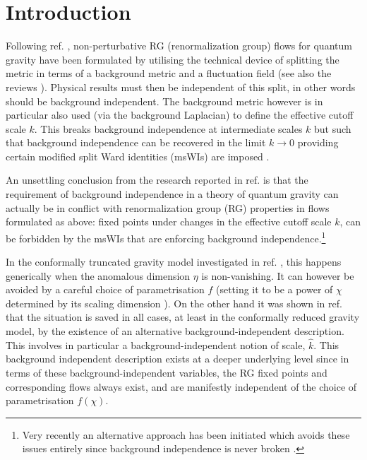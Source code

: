 \documentclass[11pt,a4paper]{article}
\numberwithin{figure}{section}
\numberwithin{equation}{section}
\begin{document}
\renewcommand{\thefootnote}{\arabic{footnote}}
\setcounter{footnote}{0}

\newpage

\tableofcontents

\newpage



\section{Introduction}\label{sec:introduction}


Following ref. \cite{Reuter:1996}, non-perturbative RG (renormalization group) flows for quantum gravity have been formulated by utilising the technical device of splitting the metric in terms of a background metric and a fluctuation field (see also the reviews \cite{Reuter:2012,Percacci:2011fr,Niedermaier:2006wt,Nagy:2012ef,Litim:2011cp}). Physical results must then be independent of this split, in other words should be background independent. The background metric however is in particular also used (via the background Laplacian) to define the effective cutoff scale $k$. This breaks background independence at intermediate scales $k$ but such that background independence can be recovered in the limit $k\to0$ providing certain modified split Ward identities (msWIs) are imposed \cite{Pawlowski:2005xe,Litim:2002hj,Bridle:2013sra,Reuter:1997gx,Litim:1998nf,Litim:2002ce,Manrique:2009uh,Manrique:2010mq,Manrique:2010am,Dietz:2015owa,Safari:2015dva}.



An unsettling conclusion from the research reported in ref. \cite{Dietz:2015owa} is that the requirement of background independence in a theory of quantum gravity can actually be in conflict with renormalization group (RG) properties in flows formulated as above: fixed points under changes in the effective cutoff scale $k$, can be forbidden by the msWIs  that are enforcing background independence.\footnote{Very recently an alternative approach has been initiated which avoids these issues entirely since background independence is never broken \cite{Morris:2016nda}.} 

In the conformally truncated gravity model investigated in ref.  \cite{Dietz:2015owa}, this happens generically when the anomalous dimension $\eta$ is non-vanishing.
It can however be avoided by a careful choice of parametrisation $f$ (setting it to be a power of $\chi$ determined by its scaling dimension \cite{Dietz:2015owa}).
On the other hand it was shown in ref. \cite{Dietz:2015owa} that the situation is saved in all cases, at least in the conformally reduced gravity model, by the existence of an alternative background-independent description. This involves in particular a background-independent notion of scale, $\hat{k}$. This background independent description exists at a deeper underlying level since in terms of these background-independent variables, the RG fixed points and corresponding flows always exist, and are manifestly independent of the choice of parametrisation $f(\chi)$.  
\end{document}
